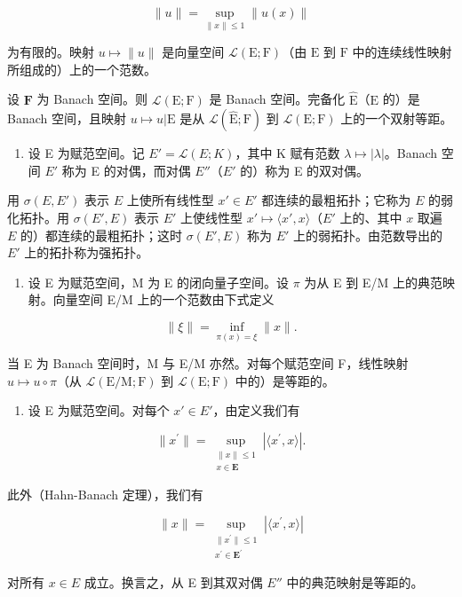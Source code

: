 \[
\| u \| = \sup _ {\| x \| \leqslant 1} \| u (x) \|\tag{1}
\]

为有限的。映射 \(u \mapsto \| u \|\) 是向量空间 \(\mathcal{L}(\mathrm{E};\mathrm{F})\)（由 \(\mathrm{E}\) 到 \(\mathrm{F}\) 中的连续线性映射所组成的）上的一个范数。

设 \(\mathbf{F}\) 为 Banach 空间。则 \(\mathcal{L}(\mathrm{E};\mathrm{F})\) 是 Banach 空间。完备化 \(\hat{\mathrm{E}}\)（\(\mathrm{E}\) 的）是 Banach 空间，且映射 \(u\mapsto u|\mathrm{E}\) 是从 \(\mathcal{L}(\hat{\mathrm{E}};\mathrm{F})\) 到 \(\mathcal{L}(\mathrm{E};\mathrm{F})\) 上的一个双射等距。

\begin{enumerate}
\def\labelenumi{\arabic{enumi})}
\setcounter{enumi}{1}
\tightlist
\item
  设 E 为赋范空间。记 \(E' = \mathcal{L}(E; K)\)，其中 K 赋有范数 \(\lambda \mapsto |\lambda|\)。Banach 空间 \(E'\) 称为 E 的对偶，而对偶 \(E''\)（\(E'\) 的）称为 E 的双对偶。
\end{enumerate}

用 \(\sigma(E, E')\) 表示 \(E\) 上使所有线性型 \(x' \in E'\) 都连续的最粗拓扑；它称为 \(E\) 的弱化拓扑。用 \(\sigma(E', E)\) 表示 \(E'\) 上使线性型 \(x' \mapsto \langle x', x \rangle\)（\(E'\) 上的、其中 \(x\) 取遍 \(E\) 的）都连续的最粗拓扑；这时 \(\sigma(E', E)\) 称为 \(E'\) 上的弱拓扑。由范数导出的 \(E'\) 上的拓扑称为强拓扑。

\begin{enumerate}
\def\labelenumi{\arabic{enumi})}
\setcounter{enumi}{2}
\tightlist
\item
  设 E 为赋范空间，M 为 E 的闭向量子空间。设 \(\pi\) 为从 E 到 E/M 上的典范映射。向量空间 E/M 上的一个范数由下式定义
\end{enumerate}

\[
\| \xi \| = \inf _ {\pi (x) = \xi} \| x \|.\tag{2}
\]

当 E 为 Banach 空间时，M 与 E/M 亦然。对每个赋范空间 F，线性映射 \(u \mapsto u \circ \pi\)（从 \(\mathcal{L}(\mathrm{E}/\mathrm{M}; \mathrm{F})\) 到 \(\mathcal{L}(\mathrm{E}; \mathrm{F})\) 中的）是等距的。

\begin{enumerate}
\def\labelenumi{\arabic{enumi})}
\setcounter{enumi}{3}
\tightlist
\item
  设 E 为赋范空间。对每个 \(x' \in E'\)，由定义我们有
\end{enumerate}

\[
\| x^{\prime}\| = \sup_{\substack{\| x\| \leqslant 1\\ x\in \mathbf{E}}}\left|\langle x^{\prime},x\rangle \right|.\tag{3}
\]

此外（Hahn-Banach 定理），我们有

\[
\| x \| = \sup_{\substack{\| x^{\prime}\| \leqslant 1\\ x^{\prime}\in \mathbf{E}^{\prime}}}\left|\langle x^{\prime},x\rangle \right|\tag{4}
\]

对所有 \(x \in E\) 成立。换言之，从 E 到其双对偶 \(E''\) 中的典范映射是等距的。
